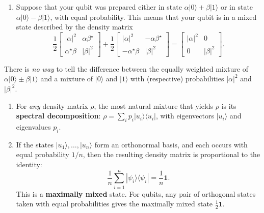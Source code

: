 \documentclass[fleqn,a4paper]{article}
\providecommand{\tightlist}{\setlength{\itemsep}{0pt}\setlength{\parskip}{0pt}}
\newenvironment{idea}{\everypar{\setlength{\parindent}{1.5em}}}{}
\theoremstyle{definition}
\theoremstyle{definition}
\theoremstyle{definition}
\theoremstyle{definition}
\theoremstyle{remark}
\begin{document}
\begin{enumerate}
\def\labelenumi{\arabic{enumi}.}
\setcounter{enumi}{2}
\tightlist
\item
  Suppose that your qubit was prepared either in state \(\alpha|0\rangle + \beta|1\rangle\) or in state \(\alpha|0\rangle - \beta|1\rangle\), with equal probability.
  This means that your qubit is in a mixed state described by the density matrix
  \[
     \frac{1}{2}
     \begin{bmatrix}
       |\alpha|^2 & \alpha\beta^\star
     \\\alpha^\star\beta & |\beta|^2
     \end{bmatrix}
     +\frac{1}{2}
     \begin{bmatrix}
       |\alpha|^2 & -\alpha\beta^\star
     \\-\alpha^\star\beta & |\beta|^2
     \end{bmatrix}
     = \begin{bmatrix}
       |\alpha|^2 & 0
     \\0 & |\beta|^2
     \end{bmatrix}.
   \]
\end{enumerate}

\begin{idea}
There is \emph{no way} to tell the difference between the equally weighted mixture of \(\alpha|0\rangle\pm\beta|1\rangle\) and a mixture of \(|0\rangle\) and \(|1\rangle\) with (respective) probabilities \(|\alpha|^2\) and \(|\beta|^2\).

\end{idea}

\begin{enumerate}
\def\labelenumi{\arabic{enumi}.}
\setcounter{enumi}{3}
\item
  For \emph{any} density matrix \(\rho\), the most natural mixture that yields \(\rho\) is its \textbf{spectral decomposition}: \(\rho=\sum_i p_i|u_i\rangle\langle u_i|\), with eigenvectors \(|u_i\rangle\) and eigenvalues \(p_i\).
\item
  If the states \(|u_1\rangle,\ldots,|u_n\rangle\) form an orthonormal basis, and each occurs with equal probability \(1/n\), then the resulting density matrix is proportional to the identity:
  \[
     \frac{1}{n}\sum_{i=1}^n |\psi_i\rangle\langle\psi_i|
     = \frac{1}{n}\mathbf{1}.
   \]
  This is a \textbf{maximally mixed} state.
  For qubits, any pair of orthogonal states taken with equal probabilities gives the maximally mixed state \(\frac{1}{2}\mathbf{1}\).
\end{enumerate}
\end{document}
